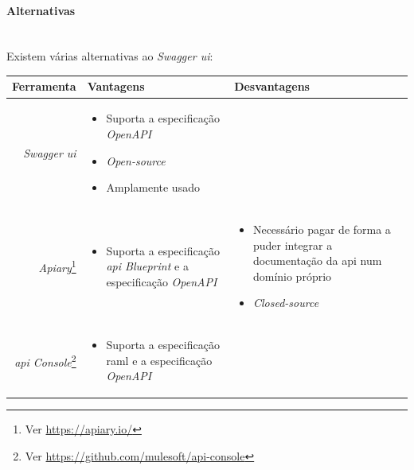 \paragraph{Alternativas} \mbox{} \\
Existem várias alternativas ao \textit{Swagger \acrshort{ui}}:
\begin{savenotes}
\begin{table}[H]
    \footnotesize
    \centering
    \begin{tabular}{|r|p{}|p{}|}
    \hline
    Ferramenta & Vantagens & Desvantagens \\ \hline
        \textit{Swagger \acrshort{ui}} &
        \begin{itemize}[leftmargin=0.3cm]
            \setlength\itemsep{0em}
            \item Suporta a especificação \textit{OpenAPI}
            \item \textit{Open-source}
            \item Amplamente usado
        \end{itemize}
        &
        \\ \hline
    \textit{Apiary}\footnote{Ver \url{https://apiary.io/}} &
        \begin{itemize}[leftmargin=0.3cm]
            \setlength\itemsep{0em}
            \item Suporta a especificação \textit{\acrshort{api} Blueprint} e a especificação \textit{OpenAPI}
        \end{itemize}
        &
        \begin{itemize}[leftmargin=0.3cm]
            \setlength\itemsep{0em}
            \item Necessário pagar de forma a puder integrar a documentação da \acrshort{api} num domínio próprio
            \item \textit{Closed-source}
        \end{itemize}
        \\ \hline
    \textit{\acrshort{api} Console}\footnote{Ver \url{https://github.com/mulesoft/api-console}} &
        \begin{itemize}[leftmargin=0.3cm]
            \setlength\itemsep{0em}
            \item Suporta a especificação \acrshort{raml} e a especificação \textit{OpenAPI}

\end{itemize}
\end{tabular}
\end{table}
\end{savenotes}
